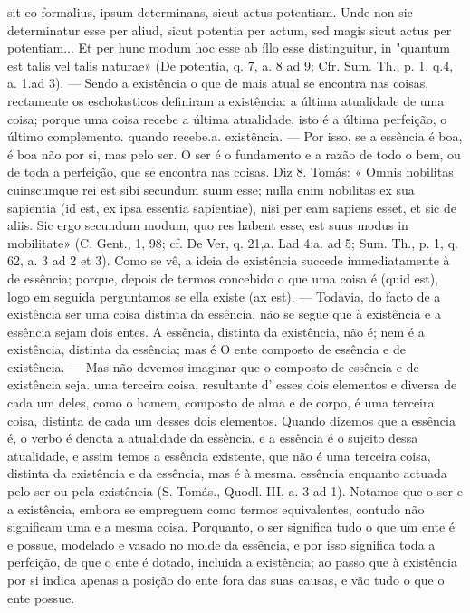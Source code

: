 \documentclass[12pt,a4paper]{article}
\newcommand{\pagmark}[1]{\quad[\textit{p.\,#1}]\quad}
\begin{document}
{{{{{{{{{{sit eo formalius, ipsum determinans, sicut actus potentiam. Unde non sic
determinatur esse per aliud, sicut potentia per actum, sed magis sicut actus
per potentiam... Et per hunc modum hoc esse ab íllo esse distinguitur, in
"quantum est talis vel talis naturae» (De potentia, q. 7, a. 8 ad 9; Cfr.
Sum. Th., p. 1. q.4, a. 1.ad 3). — Sendo a existência o que de mais atual
se encontra nas coisas, rectamente os escholasticos definiram a existência:
a última atualidade de uma coisa; porque uma coisa recebe a última atualidade, isto é a última perfeição, o último complemento. quando recebe.a.
existência. — Por isso, se a essência é boa, é boa não por si, mas pelo
ser. O ser é o fundamento e a razão de todo o bem, ou de toda a perfeição,
que se encontra nas coisas. Diz 8. Tomás: « Omnis nobilitas cuinscumque
rei est sibi secundum suum esse; nulla enim nobilitas ex sua sapientia (id
est, ex ipsa essentia sapientiae), nisi per eam sapiens esset, et sic de aliis.
\pagmark{311}
Sic ergo secundum modum, quo res habent esse, est suus modus in mobilitate» (C. Gent., 1, 98; cf. De Ver, q. 21,a. Lad 4;a. ad 5; Sum.
Th., p. 1, q. 62, a. 3 ad 2 et 3).
 Como se vê, a ideia de existência succede immediatamente à de essência;
porque, depois de termos concebido o que uma coisa é (quid est), logo em seguida perguntamos se ella existe (ax est). — Todavia, do facto de a existência
ser uma coisa distinta da essência, não se segue que à existência e a essência
sejam dois entes. A essência, distinta da existência, não é; nem é a existência,
distinta da essência; mas é O ente composto de essência e de existência. —
Mas não devemos imaginar que o composto de essência e de existência seja.
uma terceira coisa, resultante d' esses dois elementos e diversa de cada um
deles, como o homem, composto de alma e de corpo, é uma terceira coisa,
distinta de cada um desses dois elementos. Quando dizemos que a essência
é, o verbo é denota a atualidade da essência, e a essência é o sujeito dessa
atualidade, e assim temos a essência existente, que não é uma terceira coisa,
distinta da existência e da essência, mas é à mesma. essência enquanto
actuada pelo ser ou pela existência (S. Tomás., Quodl. III, a. 3 ad 1).
 Notamos que o ser e a existência, embora se empreguem como termos
equivalentes, contudo não significam uma e a mesma coisa. Porquanto, o
ser significa tudo o que um ente é e possue, modelado e vasado no molde
da essência, e por isso significa toda a perfeição, de que o ente é dotado,
incluida a existência; ao passo que à existência por si indica apenas a posição do ente fora das suas causas, e vão tudo o que o ente possue.}
\pagmark{311}

}}}}}}}}}
\end{document}
